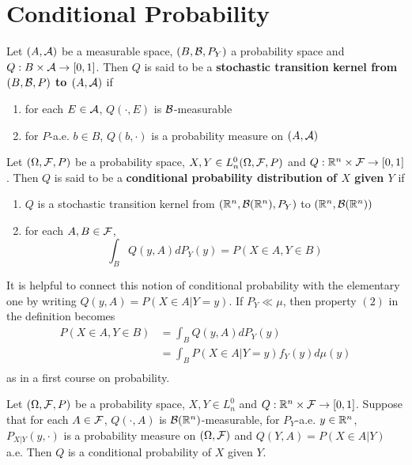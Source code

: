 \documentclass{book}
\begin{document}
	
	
	\section{Conditional Probability}
	
	\begin{defn}
	Let $(A, \mathcal{A})$ be a measurable space, $(B, \mathcal{B}, P_Y)$ a probability space and $Q:B \times \mathcal{A} \rightarrow [0,1]$. Then $Q$ is said to be a \textbf{stochastic transition kernel from $(B, \mathcal{B}, P)$ to $(A, \mathcal{A})$} if 
	\begin{enumerate}
	\item for each $E \in \mathcal{A}$, $Q(\cdot, E)$ is $\mathcal{B}$-measurable
	\item for $P$-a.e. $b \in B$, $Q(b, \cdot)$ is a probability measure on $(A, \mathcal{A})$
	\end{enumerate}
	\end{defn}	
	
	\begin{defn}
	Let $(\Omega, \mathcal{F}, P)$ be a probability space, $X,Y \in L_n^0(\Omega, \mathcal{F}, P)$ and $Q: \mathbb{R}^n  \times \mathcal{F} \rightarrow [0,1]$. Then $Q$ is said to be a \textbf{conditional probability distribution of $X$ given $Y$} if 
	\begin{enumerate}
	\item $Q$ is a stochastic transition kernel from $(\mathbb{R}^n, \mathcal{B}(\mathbb{R}^n), P_Y)$ to $(\mathbb{R}^n, \mathcal{B}(\mathbb{R}^n))$
	\item for each $A,B \in \mathcal{F}$, $$\int_B Q(y, A) dP_Y(y) = P(X \in A, Y \in B)$$ 
	\end{enumerate}
	\end{defn}
	
	\begin{note}
	It is helpful to connect this notion of conditional probability with the elementary one by writing $Q(y, A) = P(X \in A| Y = y)$. If $P_Y \ll \mu$, then property $(2)$ in the definition becomes 
	\begin{align*}
	P(X \in A, Y \in B)  
	&=  \int_B Q(y, A) dP_Y(y) \\
	&= \int_B P(X \in A|Y=y) f_Y(y)d \mu(y) \\
\end{align*}	 
	as in a first course on probability.
	\end{note}	
	
	\begin{ex}
	Let $(\Omega, \mathcal{F}, P)$ be a probability space, $X,Y \in L_n^0$ and $Q: \mathbb{R}^n \times \mathcal{F} \rightarrow [0,1]$. Suppose that for each $A \in \mathcal{F}$, $Q(\cdot, A)$ is $\mathcal{B}(\mathbb{R}^n)$-measurable, for $P_Y$-a.e. $y \in \mathbb{R}^n$, $P_{X|Y}(y, \cdot)$ is a probability measure on $(\Omega, \mathcal{F})$ and $Q(Y, A) = P(X \in A|Y)$ a.e. Then $Q$ is a conditional probability of $X$ given $Y$.
	\end{ex}	
	
\end{document}
